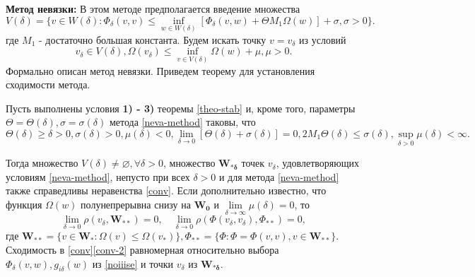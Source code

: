 \textbf{Метод невязки:} В этом методе предполагается введение множества
\begin{equation*}
V(\delta)=\{v\in W(\delta):\Phi_{\delta}(v,v)\leqslant \inf\limits_{w\in W(\delta)}[\Phi_{\delta}(v,w)+\Theta M_1\Omega(w)]+\sigma,\sigma>0\}.
\end{equation*}
где $M_1$ - достаточно большая константа. Будем искать точку $v=v_{\delta}$ из условий 
\begin{equation}
\label{neva-method}
v_{\delta}\in V(\delta),\Omega(v_{\delta})\leqslant\inf\limits_{v\in V(\delta)}\Omega(w)+\mu,\mu>0.
\end{equation} Формально описан метод невязки. Приведем теорему для установления сходимости метода.
\begin{theo}
Пусть выполнены условия \textbf{1) - 3)} теоремы \ref{theo-stab} и, кроме того, параметры $\Theta=\Theta(\delta),\sigma=\sigma(\delta)$ метода \eqref{neva-method} таковы, что
\begin{equation*}
\Theta(\delta)\geqslant \delta >0,\sigma(\delta)>0,\mu(\delta)<0,\lim\limits_{\delta\to 0}[\Theta(\delta)+\sigma(\delta)]=0,2M_1\Theta(\delta)\leqslant\sigma(\delta),\sup\limits_{\delta>0}\mu(\delta)<\infty.
\end{equation*}

Тогда множество $V(\delta) \ne\varnothing,\forall \delta > 0$, множество $\mathbf{W_{*\delta}}$ точек $v_{\delta}$, удовлетворяющих условиям \eqref{neva-method}, непусто при всех $\delta>0 $ и для метода \eqref{neva-method} также справедливы неравенства \eqref{conv}. Если дополнительно известно, что функция $\Omega(w)$ полунепрерывна снизу на $\mathbf{W_0}$ и $\lim\limits_{\delta\to\infty}\mu(\delta) = 0$, то
\begin{equation}
\label{conv-2}
\lim_{\delta\rightarrow 0}\rho(v_{\delta},\mathbf{W_{**}})=0,\quad\lim_{\delta\rightarrow 0} \rho(\Phi(v_{\delta},v_{\delta}),\Phi_{**})=0,
\end{equation}
где $\mathbf{W_{**}}=\{v\in \mathbf{W_*} : \Omega(v)\leqslant \Omega(v_*)\},\Phi_{**}=\{\Phi:\Phi=\Phi(v,v),v\in\mathbf{W_{**}} \}$. Сходимость в \eqref{conv}\eqref{conv-2} равномерная относительно выбора $\Phi_{\delta}(v,w),g_{i\delta}(w)$ из \eqref{noiiise} и точки $v_{\delta}$ из $\mathbf{W_{*\delta}}$.
\end{theo}

